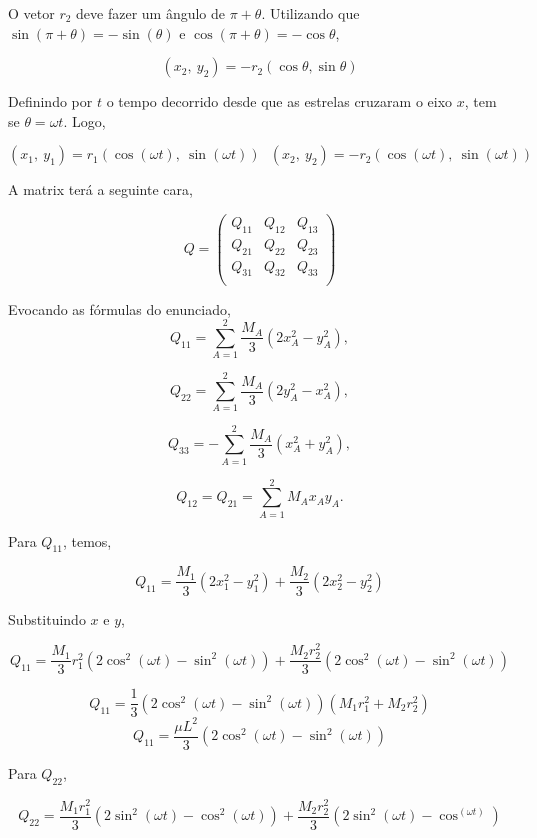 \documentclass[11pt]{article}
\begin{document}
\begin{pproblem}
\begin{pssolution*}{}{}
\begin{alternativas}
        O vetor \(r_2\) deve fazer um ângulo de \(\pi + \theta\). Utilizando que \(\sin(\pi+\theta) = -\sin(\theta)\) e \(\cos(\pi+\theta) = -\cos\theta\), 

        \[(x_2, \ y_2) = -r_2(\cos\theta, \sin\theta)\]

        Definindo por \(t\) o tempo decorrido desde que as estrelas cruzaram o eixo \(x\), tem se \(\theta = \omega t\). Logo, 

        \[\boxed{(x_1, \ y_1) = r_1 (\cos(\omega t), \ \sin(\omega t)) \ \ \ (x_2, \ y_2) = -r_2 (\cos(\omega t), \ \sin(\omega t))}\]

        \item A matrix terá a seguinte cara, 
        
        \[Q = \left(\begin{matrix}
            Q_{11} & Q_{12} & Q_{13} \\
            Q_{21} & Q_{22} & Q_{23} \\
            Q_{31} & Q_{32} & Q_{33} \\
        \end{matrix}\right)\]

        Evocando as fórmulas do enunciado, 
        \[
        Q_{11} = \sum_{A=1}^2 \frac{M_A}{3} \left( 2x_A^2 - y_A^2 \right),
        \]

        \[
        Q_{22} = \sum_{A=1}^2 \frac{M_A}{3} \left( 2y_A^2 - x_A^2 \right),
        \]

        \[
        Q_{33} = -\sum_{A=1}^2 \frac{M_A}{3} \left( x_A^2 + y_A^2 \right),
        \]

        \[
        Q_{12} = Q_{21} = \sum_{A=1}^2 M_A x_A y_A.
        \]

         Para \(Q_{11}\), temos, 

        \[Q_{11} = \frac{M_1}{3}(2x_1^2-y_1^2) + \frac{M_2}{3}(2x_2^2-y_2^2)\]

        Substituindo \(x\) e \(y\), 

        \[Q_{11} = \frac{M_1}{3}r_1^2(2\cos^2(\omega t) - \sin^2(\omega t)) + \frac{M_2r^2_2}{3}(2\cos^2(\omega t) - \sin^2(\omega t))\]

        \[Q_{11} = \frac{1}{3}(2\cos^2(\omega t) - \sin^2(\omega t))(M_1r_1^2 + M_2r_2^2)\]  
        \[Q_{11} = \frac{\mu L^2}{3}(2\cos^2(\omega t) - \sin^2(\omega t))\]

        Para \(Q_{22}\), 

        \[Q_{22} = \frac{M_1r_1^2}{3}(2\sin^2(\omega t) - \cos^2(\omega t)) + \frac{M_2r_2^2}{3}(2\sin^2(\omega t) - \cos^(\omega t))\]


\end{alternativas}
\end{pssolution*}
\end{pproblem}
\end{document}
